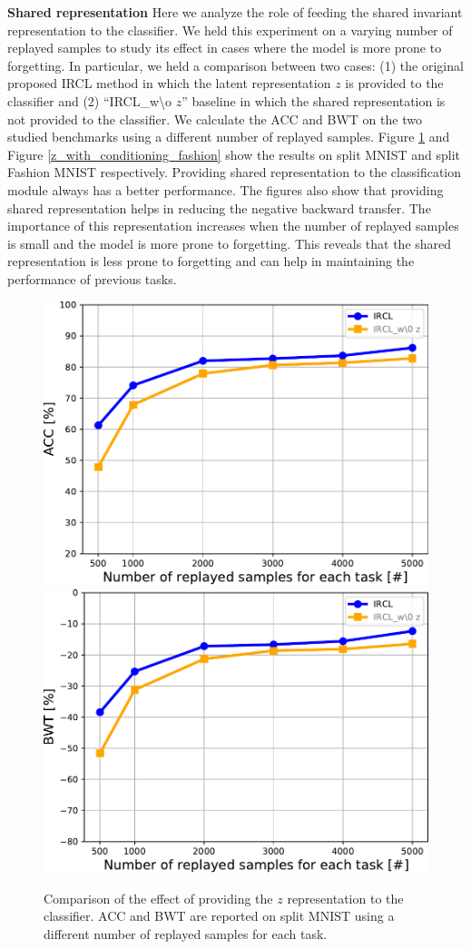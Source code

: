\documentclass[letterpaper]{article} %
\begin{document}
\textbf{Shared representation} Here we analyze the role of feeding the shared invariant representation to the classifier. We held this experiment on a varying number of replayed samples to study its effect in cases where the model is more prone to forgetting. In particular, we held a comparison between two cases: (1) the original proposed IRCL method in which the latent representation $z$ is provided to the classifier and (2) \enquote{IRCL\_w\textbackslash o $z$} baseline in which the shared representation is not provided to the classifier. We calculate the ACC and BWT on the two studied benchmarks using a different number of replayed samples. Figure \ref{z_with_conditioning_mnist} and Figure \ref{z_with_conditioning_fashion} show the results on split MNIST and split Fashion MNIST respectively. Providing shared representation to the classification module always has a better performance. The figures also show that providing shared representation helps in reducing the negative backward transfer. The importance of this representation increases when the number of replayed samples is small and the model is more prone to forgetting. This reveals that the shared representation is less prone to forgetting and can help in maintaining the performance of previous tasks.

\begin{figure}[ht]
\centering
\includegraphics[width=0.8\linewidth]{pic/w_wo_z_acc_mnist.pdf}\\
\includegraphics[width=0.8\linewidth]{pic/w_wo_z_bwt_mnist.pdf}
\caption{Comparison of the effect of providing the $z$ representation to the classifier. ACC and BWT are reported on split MNIST using a different number of replayed samples for each task.}
\label{z_with_conditioning_mnist}
\end{figure}
\end{document}
